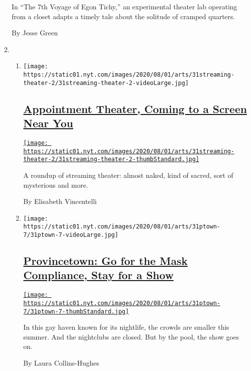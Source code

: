 \begin{enumerate}
  In ``The 7th Voyage of Egon Tichy,'' an experimental theater lab
  operating from a closet adapts a timely tale about the solitude of
  cramped quarters.

  By Jesse Green
\item
  \begin{enumerate}
  \def\labelenumii{\arabic{enumii}.}
  \item
    \texttt{[image: https://static01.nyt.com/images/2020/08/01/arts/31streaming-theater-2/31streaming-theater-2-videoLarge.jpg]}

    \hypertarget{appointment-theater-coming-to-a-screen-near-you}{%
    \subsection{\texorpdfstring{\href{/2020/07/30/theater/streaming-theater-online.html}{Appointment
    Theater, Coming to a Screen Near
    You}}{Appointment Theater, Coming to a Screen Near You}}\label{appointment-theater-coming-to-a-screen-near-you}}

    \href{/2020/07/30/theater/streaming-theater-online.html}{\texttt{[image: https://static01.nyt.com/images/2020/08/01/arts/31streaming-theater-2/31streaming-theater-2-thumbStandard.jpg]}}

    A roundup of streaming theater: almost naked, kind of sacred, sort
    of mysterious and more.

    By Elisabeth Vincentelli
  \item
    \texttt{[image: https://static01.nyt.com/images/2020/08/01/arts/31ptown-7/31ptown-7-videoLarge.jpg]}

    \hypertarget{provincetown-go-for-the-mask-compliance-stay-for-a-show}{%
    \subsection{\texorpdfstring{\href{/2020/07/31/theater/provincetown-nightlife-coronavirus.html}{Provincetown:
    Go for the Mask Compliance, Stay for a
    Show}}{Provincetown: Go for the Mask Compliance, Stay for a Show}}\label{provincetown-go-for-the-mask-compliance-stay-for-a-show}}

    \href{/2020/07/31/theater/provincetown-nightlife-coronavirus.html}{\texttt{[image: https://static01.nyt.com/images/2020/08/01/arts/31ptown-7/31ptown-7-thumbStandard.jpg]}}

    In this gay haven known for its nightlife, the crowds are smaller
    this summer. And the nightclubs are closed. But by the pool, the
    show goes on.

    By Laura Collins-Hughes
  \end{enumerate}
\end{enumerate}

